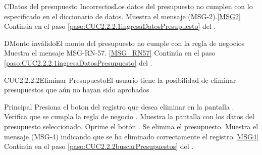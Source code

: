 	\begin{UCtrayectoriaA}{C}{Datos del presupuesto Incorrectos}{Los datos del presupuesto no cumplen con lo especificado en el diccionario de datos.}
			\UCpaso Muestra el mensaje (MSG-2).\ref{MSG2}
			\UCpaso Continúa en el paso \ref{paso:CUC2.2.2.1ingresaDatosPresupuesto} del .
	\end{UCtrayectoriaA}

	\begin{UCtrayectoriaA}{D}{Monto inválido}{El monto del presupuesto no cumple con la regla de negocios }
			\UCpaso Muestra el mensaje  {MSG-RN-57}. \ref{MSG_RN57}
			\UCpaso Continúa en el paso \ref{paso:CUC2.2.2.1ingresaDatosPresupuesto} del .
	\end{UCtrayectoriaA}



	\begin{UseCase}{CUC2.2.2.2}{Eliminar Presupuesto}{El usuario tiene la posibilidad de eliminar presupuestos que aún no hayan sido aprobados}
	\end{UseCase}

	\begin{UCtrayectoria}{Principal}
			\UCpaso[\UCactor] Presiona el boton  del registro que desea eliminar en la pantalla .
			\UCpaso Verifica que se cumpla la regla de negocio . 
			\UCpaso Muestra la pantalla  con los datos del presupuesto seleccionado. \label{paso:CUC2.2.2.2eliminarDatosPresupuesto}
			\UCpaso [\UCactor] Oprime el botón . 
			\UCpaso Se elimina el presupuesto.
			\UCpaso Muestra el mensaje (MSG-4) indicando que se ha eliminado correctamente el registro.\ref{MSG4}
			\UCpaso Continúa en el paso \ref{paso:CUC2.2.2buscarPresupuestos} del .
	\end{UCtrayectoria}


